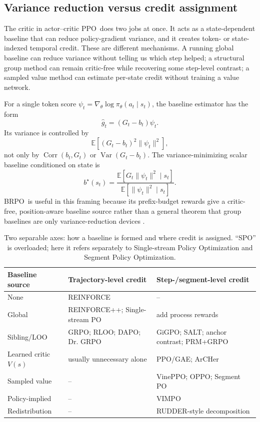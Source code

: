 \documentclass[11pt]{article}
\newcommand{\grpo}{\textsc{GRPO}}
\newcommand{\ppo}{\textsc{PPO}}
\newcommand{\vimpo}{\textsc{VIMPO}}
\newcommand{\brpo}{\textsc{BRPO}}
\newcommand{\E}{\mathbb{E}}
\begin{document}
\subsection{Variance reduction versus credit assignment}

The critic in actor--critic \ppo\ does two jobs at once. It acts as a
state-dependent baseline that can reduce policy-gradient variance, and it
creates token- or state-indexed temporal credit. These are different
mechanisms. A running global baseline can reduce variance without telling us
which step helped; a structural group method can remain critic-free while
recovering some step-level contrast; a sampled value method can estimate
per-state credit without training a value network.

For a single token score $\psi_t=\nabla_\theta\log\pi_\theta(a_t\mid s_t)$,
the baseline estimator has the form
\begin{equation}
  \widehat g_t = (G_t-b_t)\psi_t .
\end{equation}
Its variance is controlled by
\begin{equation}
  \E\!\left[(G_t-b_t)^2\|\psi_t\|^2\right],
\end{equation}
not only by $\operatorname{Corr}(b_t,G_t)$ or
$\operatorname{Var}(G_t-b_t)$. The variance-minimizing scalar baseline
conditioned on state is
\begin{equation}
  b^\star(s_t) =
  \frac{\E[G_t\|\psi_t\|^2\mid s_t]}
       {\E[\|\psi_t\|^2\mid s_t]} .
\end{equation}
\brpo\ is useful in this framing because its prefix-budget rewards give a
critic-free, position-aware baseline source rather than a general theorem that
group baselines are only variance-reduction devices
\citep{qi2025anytimereasoner}.

\begin{table}[!htbp]
\centering
\caption{Two separable axes: how a baseline is formed and where credit is
assigned. ``SPO'' is overloaded; here it refers separately to Single-stream
Policy Optimization and Segment Policy Optimization.}
\label{tab:variance-credit-taxonomy}
\scriptsize
\setlength{\tabcolsep}{2pt}
\renewcommand{\arraystretch}{1.08}
\begin{tabularx}{0.96\linewidth}{@{}L{2.0cm}YY@{}}
\toprule
Baseline source & Trajectory-level credit & Step-/segment-level credit \\
\midrule
None & REINFORCE & -- \\
Global & REINFORCE++; Single-stream PO & add process rewards \\
\addlinespace[2pt]
Sibling/LOO & \grpo; RLOO; DAPO; Dr. \grpo & GiGPO; SALT; anchor contrast; PRM+\grpo \\
\addlinespace[2pt]
Learned critic $V(s)$ & usually unnecessary alone & \ppo/GAE; ArCHer \\
Sampled value & -- & VinePPO; OPPO; Segment PO \\
Policy-implied & -- & \vimpo \\
Redistribution & -- & RUDDER-style decomposition \\
\bottomrule
\end{tabularx}
\end{table}
\end{document}
